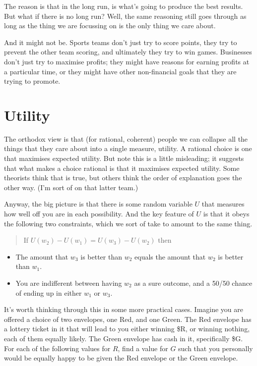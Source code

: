 The reason is that in the long run, is what's going to produce the best results. But what if there is no long run? Well, the same reasoning still goes through as long as the thing we are focussing on is the only thing we care about.

And it might not be. Sports teams don't just try to score points, they try to prevent the other team scoring, and ultimately they try to win games. Businesses don't just try to maximise profits; they might have reasons for earning profits at a particular time, or they might have other non-financial goals that they are trying to promote.

\newpage
\section{Utility}
\label{utility}

The orthodox view is that (for rational, coherent) people we can collapse all the things that they care about into a single measure, utility. A rational choice is one that maximises expected utility. But note this is a little misleading; it suggests that what makes a choice rational is that it maximises expected utility. Some theorists think that is true, but others think the order of explanation goes the other way. (I'm sort of on that latter team.)

Anyway, the big picture is that there is some random variable $U$ that measures how well off you are in each possibility. And the key feature of $U$ is that it obeys the following two constraints, which we sort of take to amount to the same thing.

\begin{quote}
If $U(w_2) - U(w_1) = U(w_3) - U(w_2)$ then
\end{quote}

\begin{itemize}
\item{} The amount that $w_3$ is better than $w_2$ equals the amount that $w_2$ is better than $w_1$.

\item{} You are indifferent between having $w_2$ as a sure outcome, and a 50\slash 50 chance of ending up in either $w_1$ or $w_3$.

\end{itemize}

It's worth thinking through this in some more practical cases. Imagine you are offered a choice of two envelopes, one Red, and one Green. The Red envelope has a lottery ticket in it that will lead to you either winning \$R, or winning nothing, each of them equally likely. The Green envelope has cash in it, specifically \$G. For each of the following values for $R$, find a value for $G$ such that you personally would be equally happy to be given the Red envelope or the Green envelope.

